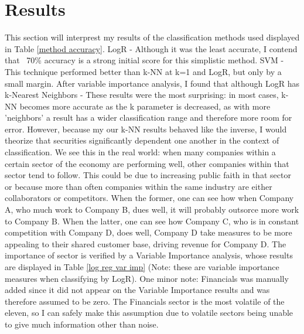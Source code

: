\documentclass[12pt]{article}
\begin{document}
	\section*{Results}\vspace{-2ex}
	This section will interprest my results of the classification methods used displayed in Table \ref{method accuracy}.
	LogR - Although it was the least accurate, I contend that ~70\% accuracy is a strong initial score for this simplistic method.
	SVM - This technique performed better than k-NN at k=1 and LogR, but only by a small margin. After variable importance analysis, I found that although LogR has 
	k-Nearest Neighbors - These results were the most surprising: in most cases, k-NN becomes more accurate as the k parameter is decreased, as with more 'neighbors' a result has a wider classification range and therefore more room for error. However, because my our k-NN results behaved like the inverse, I would theorize that securities significantly dependent one  another in the context of classification. We see this in the real world: when many companies within a certain sector of the economy are performing well, other companies within that sector tend to follow. This could be due to  increasing public faith in that sector or because more than often companies within the same industry are either collaborators or competitors. When the former, one can see how when Company A, who much work to Company B, dues well, it will probably outsorce more work to Company B. When the latter, one can see how Company C, who is in constant competition with Company D, does well, Company D take measures to be more appealing to their shared customer base,  driving revenue for Company D. The importance of sector is verified by a Variable Importance analysis, whose results are displayed in Table \ref{log reg var imp} (Note: these are variable importance measures when classifying by LogR). One minor note: Financials was manually added since it did not appear on the Variable Importance results and was therefore assumed to be zero. The Financials sector is the most volatile of the eleven, so I can safely make this assumption due to volatile sectors being unable to give much information other than noise.
	
\end{document}
